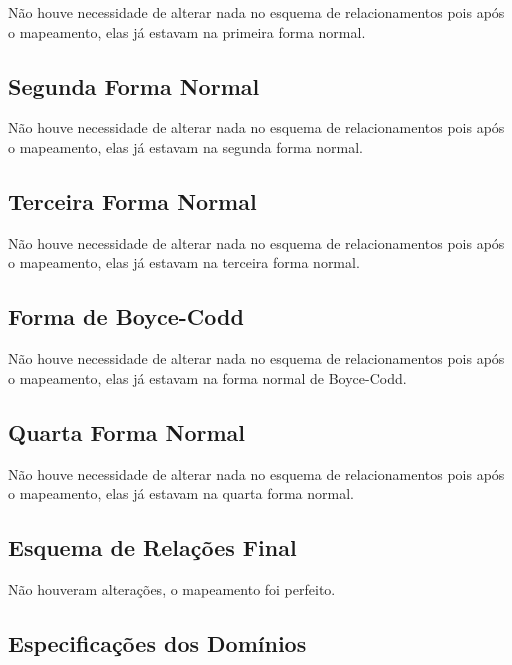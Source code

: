 \documentclass[12pt,a4paper]{article}
\begin{document}
    Não houve necessidade de alterar nada no esquema de relacionamentos pois após o mapeamento, elas já estavam na primeira forma normal.
    
\subsection{Segunda Forma Normal}

    Não houve necessidade de alterar nada no esquema de relacionamentos pois após o mapeamento, elas já estavam na segunda forma normal.
    
\subsection{Terceira Forma Normal}

    Não houve necessidade de alterar nada no esquema de relacionamentos pois após o mapeamento, elas já estavam na terceira forma normal.

\subsection{Forma de Boyce-Codd}

    Não houve necessidade de alterar nada no esquema de relacionamentos pois após o mapeamento, elas já estavam na forma normal de Boyce-Codd.
    
\subsection{Quarta Forma Normal}

    Não houve necessidade de alterar nada no esquema de relacionamentos pois após o mapeamento, elas já estavam na quarta forma normal.
    
\subsection{Esquema de Relações Final}

    Não houveram alterações, o mapeamento foi perfeito.

\subsection{Especificações dos Domínios}
\end{document}
